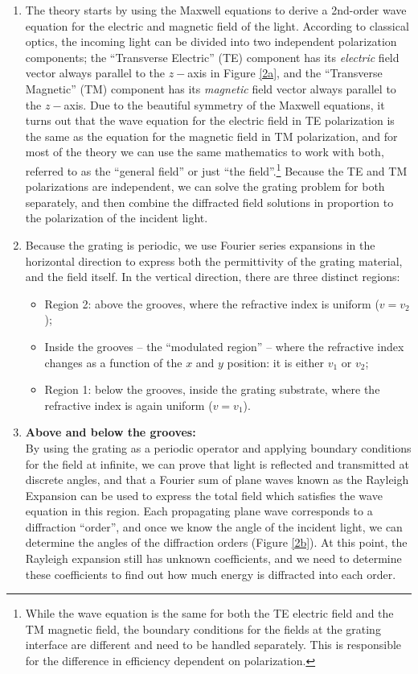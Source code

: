   \begin{enumerate}
\item The theory starts by using the Maxwell equations to derive a 2nd-order wave equation for the electric and magnetic field of the light.  According to classical optics, the incoming light can be divided into two independent polarization components; the ``Transverse Electric'' (TE) component has its \emph{electric} field vector always parallel to the $z-$axis in Figure \ref{2a}, and the ``Transverse Magnetic'' (TM) component has its \emph{magnetic} field vector always parallel to the $z-$axis.  Due to the beautiful symmetry of the Maxwell equations, it turns out that the wave equation for the electric field in TE polarization is the same as the equation for the magnetic field in TM polarization, and for most of the theory we can use the same mathematics to work with both, referred to as the ``general field'' or just ``the field''.\footnote{While the wave equation is the same for both the TE electric field and the TM magnetic field, the boundary conditions for the fields at the grating interface are different and need to be handled separately.  This is responsible for the difference in efficiency dependent on polarization.}  Because the TE and TM polarizations are independent, we can solve the grating problem for both separately, and then combine the diffracted field solutions in proportion to the polarization of the incident light.
\item Because the grating is periodic, we use Fourier series expansions in the horizontal direction to express both the permittivity of the grating material, and the field itself. In the vertical direction, there are three distinct regions:
	\begin{itemize}
	\item Region 2: above the grooves, where the refractive index is uniform ($v = v_2$);
	\item Inside the grooves -- the ``modulated region'' -- where the refractive index changes as a function of the $x$ and $y$ position: it is either $v_1$ or $v_2$;
	\item Region 1: below the grooves, inside the grating substrate, where the refractive index is again uniform ($v=v_1$).
	\end{itemize}
\item \textbf{Above and below the grooves:}\\
By using the grating as a periodic operator and applying boundary conditions for the field at infinite, we can prove that light is reflected and transmitted at discrete angles, and that a Fourier sum of plane waves known as the Rayleigh Expansion can be used to express the total field which satisfies the wave equation in this region.  Each propagating plane wave corresponds to a diffraction ``order'', and once we know the angle of the incident light, we can determine the angles of the diffraction orders (Figure \ref{2b}).  At this point, the Rayleigh expansion still has unknown coefficients, and we need to determine these coefficients to find out how much energy is diffracted into each order.

\end{enumerate}
